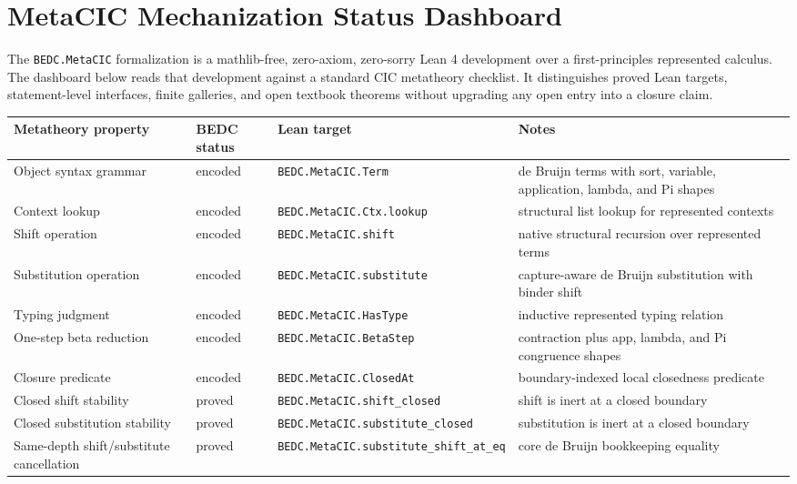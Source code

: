 \section*{MetaCIC Mechanization Status Dashboard}
\label{sec:metacic-mechanization-status}

The \texttt{BEDC.MetaCIC} formalization is a mathlib-free, zero-axiom,
zero-sorry Lean 4 development over a first-principles represented calculus.
The dashboard below reads that development against a standard CIC
metatheory checklist. It distinguishes proved Lean targets, statement-level
interfaces, finite galleries, and open textbook theorems without upgrading
any open entry into a closure claim.

\begin{longtable}{p{}p{}p{}p{}}
\toprule
\textbf{Metatheory property} & \textbf{BEDC status} & \textbf{Lean target} & \textbf{Notes}\\
\midrule
\endhead
Object syntax grammar &
encoded &
\texttt{BEDC.MetaCIC.Term} &
de Bruijn terms with sort, variable, application, lambda, and Pi shapes\\
Context lookup &
encoded &
\texttt{BEDC.MetaCIC.Ctx.lookup} &
structural list lookup for represented contexts\\
Shift operation &
encoded &
\texttt{BEDC.MetaCIC.shift} &
native structural recursion over represented terms\\
Substitution operation &
encoded &
\texttt{BEDC.MetaCIC.substitute} &
capture-aware de Bruijn substitution with binder shift\\
Typing judgment &
encoded &
\texttt{BEDC.MetaCIC.HasType} &
inductive represented typing relation\\
One-step beta reduction &
encoded &
\texttt{BEDC.MetaCIC.BetaStep} &
contraction plus app, lambda, and Pi congruence shapes\\
Closure predicate &
encoded &
\texttt{BEDC.MetaCIC.ClosedAt} &
boundary-indexed local closedness predicate\\
Closed shift stability &
proved &
\texttt{BEDC.MetaCIC.shift\_closed} &
shift is inert at a closed boundary\\
Closed substitution stability &
proved &
\texttt{BEDC.MetaCIC.substitute\_closed} &
substitution is inert at a closed boundary\\
Same-depth shift/substitute cancellation &
proved &
\texttt{BEDC.MetaCIC.substitute\_shift\_at\_eq} &
core de Bruijn bookkeeping equality\\

\end{longtable}

